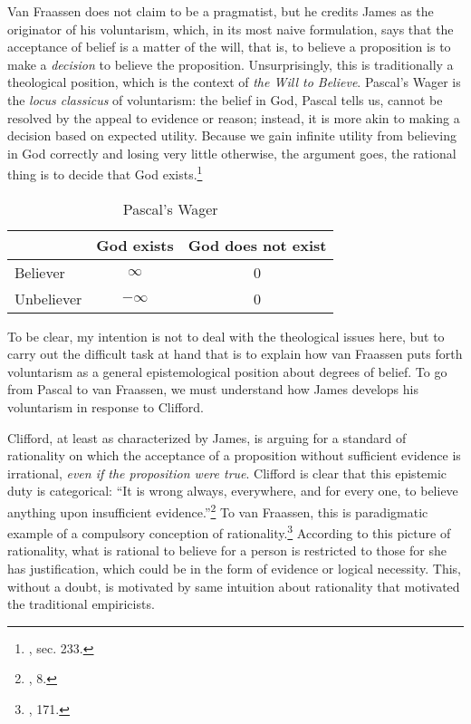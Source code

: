 Van Fraassen does not claim to be a pragmatist, but he credits James as
the originator of his voluntarism, which, in its most naive formulation,
says that the acceptance of belief is a matter of the will, that is, to
believe a proposition is to make a \emph{decision} to believe the
proposition. Unsurprisingly, this is traditionally a theological
position, which is the context of \emph{the Will to Believe}. Pascal's
Wager is the \emph{locus classicus} of voluntarism: the belief in God,
Pascal tells us, cannot be resolved by the appeal to evidence or reason;
instead, it is more akin to making a decision based on expected utility.
Because we gain infinite utility from believing in God correctly and
losing very little otherwise, the argument goes, the rational thing is
to decide that God exists.\footnote{\cite{pascal}, sec. 233.}

	\begin{table}[h]\label{pascalswager}
	\centering
  \begin{tabular}{l|cc}
    & God exists& God does not exist\\
    \hline
    Believer& $\infty$  & 0\\
    Unbeliever&$-\infty$ &0
  \end{tabular}
  \caption{Pascal's Wager}
  
\end{table}

To be clear, my intention is not to deal with the theological issues
here, but to carry out the difficult task at hand that is to explain how van Fraassen puts forth voluntarism as a general epistemological position about
degrees of belief. To go from Pascal to van Fraassen, we must understand
how James develops his voluntarism in response to Clifford.

Clifford, at least as characterized by James, is arguing for a standard
of rationality on which the acceptance of a proposition without
sufficient evidence is irrational, \emph{even if the proposition were
true}. Clifford is clear that this epistemic duty is categorical: ``It
is wrong always, everywhere, and for every one, to believe anything upon
insufficient evidence.''\footnote{\cite{jameswill}, 8.} To van
Fraassen, this is paradigmatic example of a compulsory conception of
rationality.\footnote{\cite{bvflaws}, 171.}
According to this picture of rationality, what is rational to believe
for a person is restricted to those for she has justification, which
could be in the form of evidence or logical necessity. This, without a
doubt, is motivated by same intuition about rationality that motivated
the traditional empiricists.

